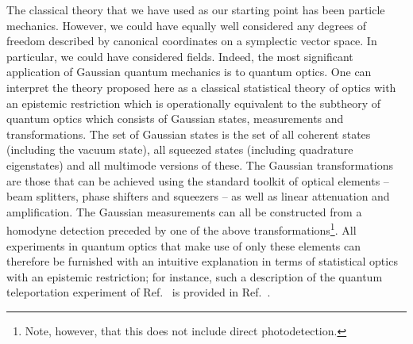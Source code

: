 \documentclass[pra,superscriptaddress,nofootinbib,12pt]{revtex4-2}
\begin{document}
The classical theory that we have used as our starting point has been particle mechanics. However, we could have equally well considered any degrees of freedom described by canonical coordinates on a symplectic vector space.  In particular, we could have considered fields.  Indeed, the most significant application of Gaussian quantum mechanics is to quantum optics.  One can interpret the theory proposed here as a classical statistical theory of optics with an epistemic restriction which is operationally equivalent to the subtheory of quantum optics which consists of Gaussian states, measurements and transformations.  The set of Gaussian states is the set of all coherent states (including the vacuum state), all squeezed states (including quadrature eigenstates) and all multimode versions of these.  The Gaussian transformations are those that can be achieved using the standard toolkit of optical elements -- beam splitters, phase shifters and squeezers -- as well as linear attenuation and amplification.  The Gaussian measurements can all be constructed from a homodyne detection preceded by one of the above transformations\footnote{Note, however, that this does not include direct photodetection.}.  All experiments in quantum optics that make use of only these elements can therefore be furnished with an intuitive explanation in terms of statistical optics with an epistemic restriction; for instance, such a description of the quantum teleportation experiment of Ref.~\cite{Fur98} is provided in Ref.~\cite{Cav04}.

\end{document}
